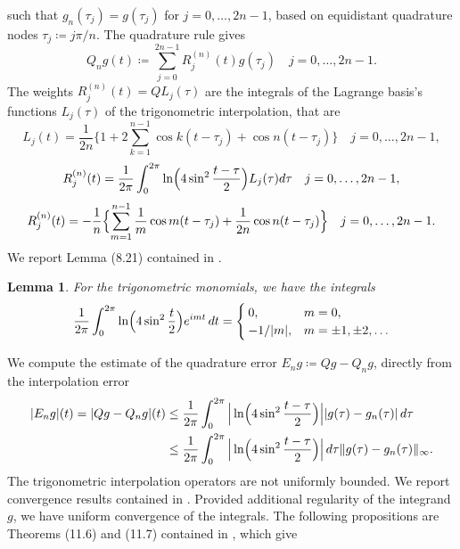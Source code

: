 \documentclass[10pt, a4paper, twoside, openright]{book}
\theoremstyle{definition}
\theoremstyle{plain}
\theoremstyle{plain}
\theoremstyle{plain}
\theoremstyle{plain}
\theoremstyle{plain}
\newtheorem{lemma}[subsection]{Lemma}
\theoremstyle{plain}
\theoremstyle{plain}
\theoremstyle{plain}
\begin{document}
such that $g_n(\tau_j) = g(\tau_j)$ for $j=0,\dots,2n-1$, based on equidistant quadrature nodes $\tau_j\coloneqq j\pi/n$. 
The quadrature rule gives
\begin{equation}
 Q_ng(t)\coloneqq \sum_{j=0}^{2n-1}R_j^{(n)}(t)g(\tau_j)\quad j=0,\dots, 2n-1.
\end{equation}
The weights $R_j^{(n)}(t)=QL_j(\tau)$ are the integrals of the Lagrange basis's functions $L_j(\tau)$ of the trigonometric interpolation, that are
\begin{equation}
 L_j(t)=\frac{1}{2n}\Big\{1+2\sum_{k=1}^{n-1}\cos k(t- \tau_j) + \cos n(t - \tau_j)\Big\}\quad j=0,\dots,2n-1,
\end{equation}
\begin{equation}
 R_j^{(n)}(t)=\frac{1}{2\pi}\int_0^{2\pi}\ln\Bigl(4\sin^2\frac{t-\tau}{2}\Bigr)L_j(\tau)d\tau \quad j=0,\dots,2n-1,
\end{equation}
\begin{equation}
 R_j^{(n)}(t)=-\frac{1}{n}\Bigl\{\sum_{m=1}^{n-1}\frac{1}{m}\cos m(t-\tau_j) + \frac{1}{2n}\cos n(t-\tau_j)\Bigr\} \quad j=0,\dots,2n-1.
\end{equation}
We report Lemma (8.21) contained in \cite{kress:book}.
\begin{lemma}
For the trigonometric monomials, we have the integrals
\begin{equation}
 \frac{1}{2\pi}\int_0^{2\pi}\ln\Bigl(4\sin^2\frac{t}{2}\Bigr)e^{imt}\,dt=
 \begin{cases}
  0, & m=0, \\
  -1/|m|, & m=\pm1,\pm2,\dots
 \end{cases}
\end{equation}
\end{lemma}
We compute the estimate of the quadrature error $E_ng\coloneqq Qg - Q_ng$, directly from the interpolation error
\begin{align}
 |E_ng|(t)=|Qg-Q_ng|(t)&\leq\frac{1}{2\pi}\int_0^{2\pi}\Big|\ln\Bigl(4\sin^2\frac{t-\tau}{2}\Bigr)\Big||g(\tau)-g_n(\tau)|\,d\tau \\
 &\leq \frac{1}{2\pi} \int_0^{2\pi}\Big|\ln\Bigl(4\sin^2\frac{t-\tau}{2}\Bigr)\Big|\,d\tau\|g(\tau) - g_n(\tau)\|_{\infty}.
\end{align}
The trigonometric interpolation operators are not uniformly bounded. We report convergence results contained in \cite{kress:book}. 
Provided additional regularity of the integrand $g$, we have uniform convergence of the integrals. 
The following propositions are Theorems (11.6) and (11.7) contained in \cite{kress:book}, which give 
\end{document}
